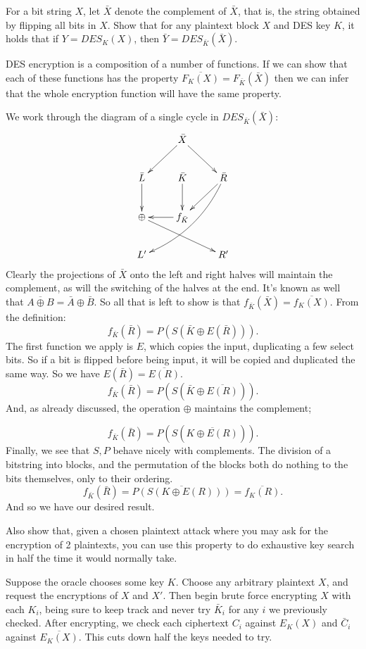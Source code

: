 \documentclass{article}
\begin{document}
\begin{exe}
For a bit string $X$, let $\bar{X}$ denote the complement of $\bar{X}$, that is, the string obtained by flipping all bits in $X$. Show that for any plaintext block $X$ and DES key $K$, it holds that if $Y = DES_K(X)$, then $\bar{Y} = DES_{\bar{K}}( \bar{X}).$ 
\end{exe}
DES encryption is a composition of a number of functions. If we can show that each of these functions has the property $\overline{F_K(X)}=F_{\bar{K}} (\bar{X})$ then we can infer that the whole encryption function will have the same property.

We work through the diagram of a single cycle in $DES_{\bar{K}} (\bar{X})$:
\[\xymatrix{
    &\bar{X}\ar@{->}[dr]^{}\ar@{->}[dl]_{}\\
        \bar{L}\ar@{->}[d]^{}&\bar{K}\ar@{->}[d]^{}&\bar{R}\ar@/^1pc/[lldd]^{}\ar@{->}[ld]^{}\\
    \oplus \ar@{->}[drr]^{}  &f_{\bar{K}}\ar@{->}[l]^{}\\
        L'&&R'
}\]
Clearly the projections of $\bar{X}$ onto the left and right halves will maintain the complement, as will the switching of the halves at the end. It's known as well that $\overline{A\oplus  B}=\bar{A}\oplus  \bar{B}$. So all that is left to show is that ${f}_{\bar{K}}(\bar{X})=\overline{f_K(X)}$. From the definition:
\[
    f_{\bar{K}}(\bar{R})=P(S(\bar{K}\oplus  E(\bar{R})))
.\] 
The first function we apply is $E$, which copies the input, duplicating a few select bits. So if a bit is flipped before being input, it will be copied and duplicated the same way. So we have $E(\bar{R})=\overline{E(R)}$.
\[
    f_{\bar{K}}(\bar{R})=P(S(\bar{K}\oplus  \overline{E(R)}))
.\] 
And, as already discussed, the operation $\oplus  $ maintains the complement;

\[
    f_{\bar{K}}(\bar{R})=P(S(\overline{{K}\oplus  E(R)}))
.\] 
Finally, we see that $S,P$ behave nicely with complements. The division of a bitstring into blocks, and the permutation of the blocks both do nothing to the bits themselves, only to their ordering.
\[
    f_{\bar{K}}(\bar{R})=\overline{P(S({K}\oplus  E(R)))}=\overline{f_K(R)}
.\] 
And so we have our desired result.


\begin{exe}
    Also show that, given a chosen plaintext attack where you may ask for the encryption of 2 plaintexts, you can use this property to do exhaustive key search in half the time it would normally take.
\end{exe}

Suppose the oracle chooses some key $K$. Choose any arbitrary plaintext $X$, and request the encryptions of $X$ and $X'$. Then begin brute force encrypting $X$ with each $K_i$, being sure to keep track and never try $\bar{K}_i$ for any $i$ we previously checked. After encrypting, we check each ciphertext $C_i$ against $E_K(X)$ and $\bar{C}_i$ against $\overline{E_K(X)}$. This cuts down half the keys needed to try.
\end{document}
